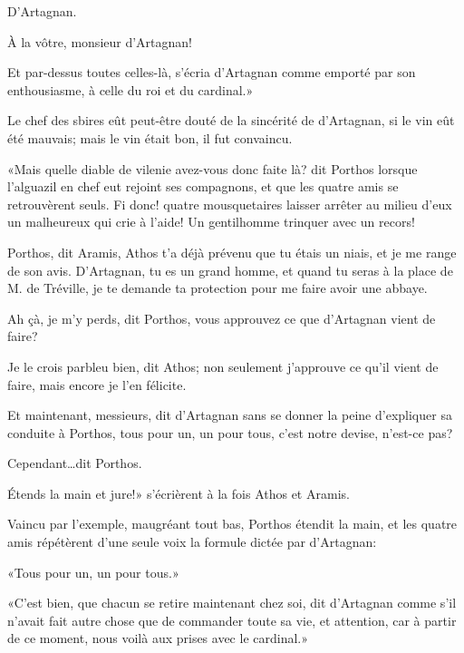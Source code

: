 \speak  D'Artagnan. 

\speak  À la vôtre, monsieur d'Artagnan! 

\speak  Et par-dessus toutes celles-là, s'écria d'Artagnan comme emporté par son enthousiasme, à celle du roi et du cardinal.» 

Le chef des sbires eût peut-être douté de la sincérité de d'Artagnan, si le vin eût été mauvais; mais le vin était bon, il fut convaincu. 

«Mais quelle diable de vilenie avez-vous donc faite là? dit Porthos lorsque l'alguazil en chef eut rejoint ses compagnons, et que les quatre amis se retrouvèrent seuls. Fi donc! quatre mousquetaires laisser arrêter au milieu d'eux un malheureux qui crie à l'aide! Un gentilhomme trinquer avec un recors! 

\speak  Porthos, dit Aramis, Athos t'a déjà prévenu que tu étais un niais, et je me range de son avis. D'Artagnan, tu es un grand homme, et quand tu seras à la place de M. de Tréville, je te demande ta protection pour me faire avoir une abbaye. 

\speak  Ah çà, je m'y perds, dit Porthos, vous approuvez ce que d'Artagnan vient de faire? 

\speak  Je le crois parbleu bien, dit Athos; non seulement j'approuve ce qu'il vient de faire, mais encore je l'en félicite. 

\speak  Et maintenant, messieurs, dit d'Artagnan sans se donner la peine d'expliquer sa conduite à Porthos, tous pour un, un pour tous, c'est notre devise, n'est-ce pas? 

\speak  Cependant\dots dit Porthos. 

\speak  Étends la main et jure!» s'écrièrent à la fois Athos et Aramis. 

Vaincu par l'exemple, maugréant tout bas, Porthos étendit la main, et les quatre amis répétèrent d'une seule voix la formule dictée par d'Artagnan: 

«Tous pour un, un pour tous.» 

«C'est bien, que chacun se retire maintenant chez soi, dit d'Artagnan comme s'il n'avait fait autre chose que de commander toute sa vie, et attention, car à partir de ce moment, nous voilà aux prises avec le cardinal.»